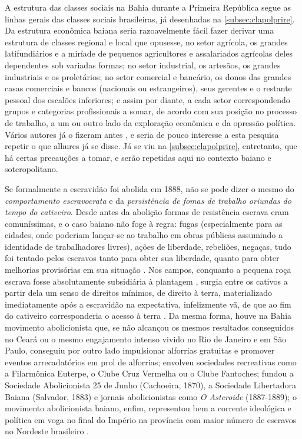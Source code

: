 A estrutura das classes sociais na Bahia durante a Primeira República segue as linhas gerais das classes sociais brasileiras, já desenhadas na \autoref{subsec:clapolprire}. Da estrutura econômica baiana seria razoavelmente fácil fazer derivar uma estrutura de classes regional e local que opusesse, no setor agrícola, os grandes latifundiários e a miríade de pequenos agricultores e assalariados agrícolas deles dependentes sob variadas formas; no setor industrial, os artesãos, os grandes industriais e os proletários; no setor comercial e bancário, os donos das grandes casas comerciais e bancos (nacionais ou estrangeiros), seus gerentes e o restante pessoal dos escalões inferiores; e assim por diante, a cada setor correspondendo grupos e categorias profissionais a somar, de acordo com sua posição no processo de trabalho, a um ou outro lado da exploração econômica e da opressão política. Vários autores já o fizeram antes \cite{castellucci_salvador_2001,CPE1980,santos_repovo_2001}, e seria de pouco interesse a esta pesquisa repetir o que alhures já se disse. Já se viu na \autoref{subsec:clapolprire}, entretanto, que há certas precauções a tomar, e serão repetidas aqui no contexto baiano e soteropolitano.

Se formalmente a escravidão foi abolida em 1888, não se pode dizer o mesmo do \textit{comportamento escravocrata} e da \textit{persistência de fomas de trabalho oriundas do tempo do cativeiro}. Desde antes da abolição formas de resistência escrava eram comuníssimas, e o caso baiano não foge à regra: fugas (especialmente para as cidades, onde poderiam lançar-se ao trabalho em obras públicas assumindo a identidade de trabalhadores livres), ações de liberdade, rebeliões, negaças, tudo foi tentado pelos escravos tanto para obter sua liberdade, quanto para obter melhorias provisórias em sua situação \cite[p.~45-52]{fraga_encruzilhadas_2014}. Nos campos, conquanto a pequena roça escrava fosse absolutamente subsidiária à plantagem \cite{gorender_escracolo_2010}, surgia entre os cativos a partir dela um senso de direitos mínimos, de direito à terra, materializado imediatamente após a escravidão na expectativa, infelizmente vã, de que ao fim do cativeiro corresponderia o acesso à terra \cite{fraga_encruzilhadas_2014}. Da mesma forma, houve na Bahia movimento abolicionista que, se não alcançou os mesmos resultados conseguidos no Ceará ou o mesmo engajamento intenso vivido no Rio de Janeiro e em São Paulo, conseguiu por outro lado impulsionar alforrias gratuitas e promover eventos arrecadatórios em prol de alforrias; envolveu sociedades recreativas como a Filarmônica Euterpe, o Clube Cruz Vermelha ou o Clube Fantoches; fundou a Sociedade Abolicionista 25 de Junho (Cachoeira, 1870), a Sociedade Libertadora Baiana (Salvador, 1883) e jornais abolicionistas como \textit{O Asteroide} (1887-1889); o movimento abolicionista baiano, enfim, representou bem a corrente ideológica e política em voga no final do Império na província com maior número de escravos no Nordeste brasileiro \cite{brito2003abolicao}.

